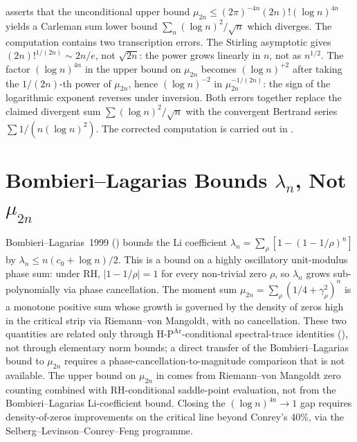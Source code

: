  asserts that the unconditional
upper bound \(\mu_{2n}\le (2\pi)^{-4n}(2n)!(\log n)^{4n}\) yields a
Carleman sum lower bound \(\sum_{n}(\log n)^{2}/\sqrt{n}\) which
diverges. The computation contains two transcription errors. The
Stirling asymptotic gives \((2n)!^{1/(2n)}\sim 2n/e\), not
\(\sqrt{2n}\): the power grows linearly in \(n\), not as
\(n^{1/2}\). The factor \((\log n)^{4n}\) in the upper bound
on \(\mu_{2n}\) becomes \((\log n)^{+2}\) after taking the
\(1/(2n)\)-th power of \(\mu_{2n}\), hence \((\log n)^{-2}\) in
\(\mu_{2n}^{-1/(2n)}\): the sign of the logarithmic exponent
reverses under inversion. Both errors together replace the claimed
divergent sum \(\sum(\log n)^{2}/\sqrt{n}\) with the convergent
Bertrand series \(\sum 1/(n(\log n)^{2})\). The corrected computation
is carried out in .

\section{Bombieri--Lagarias Bounds \(\lambda_{n}\), Not \(\mu_{2n}\)}
\label{v4-arith:r-audit:BL-lambda-not-mu}

Bombieri--Lagarias~1999
() bounds the Li coefficient
\(\lambda_{n}=\sum_{\rho}[1-(1-1/\rho)^{n}]\) by
\(\lambda_{n}\leq n(c_{0}+\log n)/2\). This is a bound on a highly
oscillatory unit-modulus phase sum: under RH, \(|1-1/\rho|=1\) for
every non-trivial zero \(\rho\), so \(\lambda_{n}\) grows
sub-polynomially via phase cancellation. The moment sum
\(\mu_{2n}=\sum_{\rho}(1/4+\gamma_{\rho}^{2})^{n}\) is a monotone
positive sum whose growth is governed by the density of zeros high
in the critical strip via Riemann--von Mangoldt, with no
cancellation. These two quantities are related only through
\(\mathrm{H\text{-}P}^{\mathrm{Ar}}\)-conditional spectral-trace
identities (), not through
elementary norm bounds; a direct transfer of the Bombieri--Lagarias
bound to \(\mu_{2n}\) requires a phase-cancellation-to-magnitude
comparison that is not available. The upper bound on
\(\mu_{2n}\) in 
comes from Riemann--von Mangoldt zero counting combined with
RH-conditional saddle-point evaluation, not from the
Bombieri--Lagarias Li-coefficient bound. Closing the
\((\log n)^{4n}\to 1\) gap requires density-of-zeros improvements
on the critical line beyond Conrey's 40\%, via the
Selberg--Levinson--Conrey--Feng programme.

